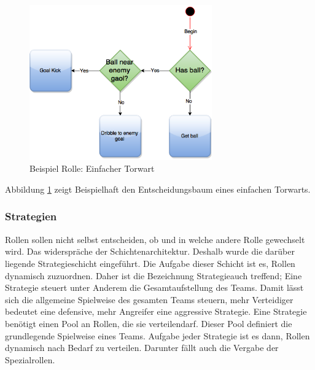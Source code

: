 \documentclass[fontsize=12pt,a4paper,final]{scrartcl}[2003/01/01]
\begin{document}
\begin{figure}[H]
	\centering
	\includegraphics[width=0.7\textwidth]{Grafiken/KI/simple_Player}
	\caption{Beispiel Rolle: Einfacher Torwart}
	\label{Simple keeper}
\end{figure}

Abbildung \ref{Simple keeper} zeigt Beispielhaft den Entscheidungsbaum eines einfachen Torwarts.

\subsubsection{Strategien}
Rollen sollen nicht selbst entscheiden, ob und in welche andere Rolle gewechselt wird. Das widerspräche der Schichtenarchitektur. Deshalb wurde die darüber liegende Strategieschicht eingeführt. Die Aufgabe dieser Schicht ist es, Rollen dynamisch zuzuordnen. Daher ist die Bezeichnung \glqq Strategie\grqq auch treffend; Eine Strategie steuert unter Anderem die Gesamtaufstellung des Teams. Damit lässt sich die allgemeine Spielweise des gesamten Teams steuern, mehr Verteidiger bedeutet eine defensive, mehr Angreifer eine aggressive Strategie. Eine Strategie benötigt einen Pool an Rollen, die sie \glqq verteilen\grqq darf. Dieser Pool definiert die grundlegende Spielweise eines Teams. Aufgabe jeder Strategie ist es dann, Rollen dynamisch nach Bedarf zu verteilen. Darunter fällt auch die Vergabe der Spezialrollen.
\end{document}
